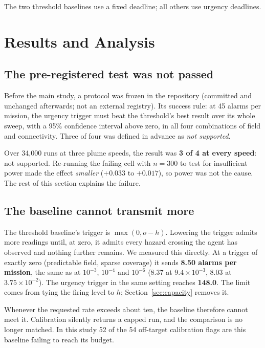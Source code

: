 \documentclass[pdflatex,sn-mathphys-num,iicol]{sn-jnl}
\theoremstyle{thmstyleone}
\theoremstyle{thmstyletwo}
\theoremstyle{thmstylethree}
\begin{document}
The two threshold baselines use a fixed deadline; all others use urgency deadlines.

\section{Results and Analysis}\label{sec:results}

\subsection{The pre-registered test was not passed}\label{sec:prereg}

Before the main study, a protocol was frozen in the repository (committed and unchanged
afterwards; not an external registry). Its success rule: at 45 alarms per mission, the
urgency trigger must beat the threshold's best result over its whole sweep, with a 95\%
confidence interval above zero, in all four combinations of field and connectivity.
Three of four was defined in advance as \emph{not supported}.

Over 34{,}000 runs at three plume speeds, the result was \textbf{3 of 4 at every speed}:
not supported. Re-running the failing cell with $n=300$ to test for insufficient power made
the effect \emph{smaller} ($+0.033$ to $+0.017$), so power was not the cause. The rest of
this section explains the failure.

\subsection{The baseline cannot transmit more}\label{sec:saturation}

The threshold baseline's trigger is $\max(0, o-h)$. Lowering the trigger admits more
readings until, at zero, it admits every hazard crossing the agent has observed and
nothing further remains. We measured this directly. At a trigger of exactly zero (predictable
field, sparse coverage) it sends \textbf{8.50 alarms per mission}, the same as at
$10^{-3}$, $10^{-4}$ and $10^{-6}$ (8.37 at $9.4\times10^{-3}$, 8.03 at
$3.75\times10^{-2}$). The urgency trigger in the same setting reaches \textbf{148.0}.
The limit comes from tying the firing level to $h$; Section~\ref{sec:capacity} removes it.

Whenever the requested rate exceeds about ten, the baseline therefore cannot meet it.
Calibration silently returns a capped run, and the comparison is no longer matched. In this study 52 of
the 54 off-target calibration flags are this baseline failing to reach its budget.
\end{document}
